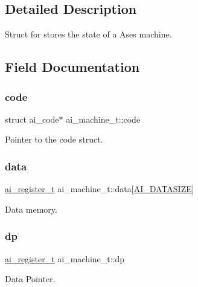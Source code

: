 \subsection{Detailed Description}
Struct for stores the state of a Ases machine. 

\subsection{Field Documentation}
\mbox{\label{structai__machine__t_a1802fde997047838d249591ba9fac9e0}} 
\subsubsection{\texorpdfstring{code}{code}}
{\footnotesize\ttfamily struct ai\+\_\+code$\ast$ ai\+\_\+machine\+\_\+t\+::code}

Pointer to the code struct. \mbox{\label{structai__machine__t_abdf16a0e0f99b24c7b4346a241847501}} 
\subsubsection{\texorpdfstring{data}{data}}
{\footnotesize\ttfamily \hyperlink{machine_8h_a74ebfc967a5948f22ad4c9dffa32c233}{ai\+\_\+register\+\_\+t} ai\+\_\+machine\+\_\+t\+::data\mbox{[}\hyperlink{machine_8h_a617e04abe8ee4d0de5f12db1afd8c344}{A\+I\+\_\+\+D\+A\+T\+A\+S\+I\+ZE}\mbox{]}}

Data memory. \mbox{\label{structai__machine__t_a58f5a8788a72265500bda757e0c7b2c9}} 
\subsubsection{\texorpdfstring{dp}{dp}}
{\footnotesize\ttfamily \hyperlink{machine_8h_a74ebfc967a5948f22ad4c9dffa32c233}{ai\+\_\+register\+\_\+t} ai\+\_\+machine\+\_\+t\+::dp}

Data Pointer. \mbox{\label{structai__machine__t_a1d67ad8b87ea88aa540c1c8a3ad155fc}} 
